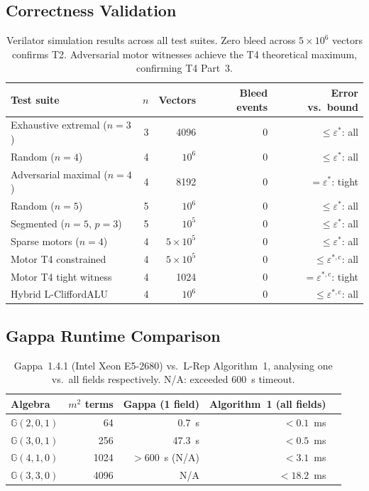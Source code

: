 \documentclass[11pt,a4paper]{article}
\theoremstyle{definition}
\theoremstyle{plain}
\theoremstyle{remark}
\newcommand{\GA}{\mathbb{G}}
\begin{document}
\subsection{Correctness Validation}

\begin{table}[h]
\centering
\caption{Verilator simulation results across all test suites.
Zero bleed across $5\times10^6$ vectors confirms T2.
Adversarial motor witnesses achieve the T4 theoretical maximum, confirming T4 Part~3.}
\label{tab:correctness}
\begin{tabular}{lrrrr}
\toprule
Test suite & $n$ & Vectors & Bleed events & Error vs.\ bound \\
\midrule
Exhaustive extremal ($n=3$) & 3 & 4096 & 0 & $\le\varepsilon^*$: all \\
Random ($n=4$) & 4 & $10^6$ & 0 & $\le\varepsilon^*$: all \\
Adversarial maximal ($n=4$) & 4 & 8192 & 0 & $=\varepsilon^*$: tight \\
Random ($n=5$) & 5 & $10^6$ & 0 & $\le\varepsilon^*$: all \\
Segmented ($n=5$, $p=3$) & 5 & $10^5$ & 0 & $\le\varepsilon^*$: all \\
Sparse motors ($n=4$) & 4 & $5\times10^5$ & 0 & $\le\varepsilon^*$: all \\
Motor T4 constrained & 4 & $5\times10^5$ & 0 & $\le\varepsilon^{*,\mathrm{c}}$: all \\
Motor T4 tight witness & 4 & 1024 & 0 & $=\varepsilon^{*,\mathrm{c}}$: tight \\
Hybrid L-CliffordALU & 4 & $10^6$ & 0 & $\le\varepsilon^{*,\mathrm{c}}$: all \\
\bottomrule
\end{tabular}
\end{table}

\subsection{Gappa Runtime Comparison}
\label{sec:gappa-comparison}

\begin{table}[h]
\centering
\caption{Gappa~1.4.1 (Intel Xeon E5-2680) vs.\ L-Rep Algorithm~1,
analysing one vs.\ all fields respectively.
N/A: exceeded 600~s timeout.}
\label{tab:gappa}
\begin{tabular}{lrrrr}
\toprule
Algebra & $m^2$ terms & Gappa (1 field) & Algorithm~1 (all fields) \\
\midrule
$\GA(2,0,1)$ & 64 & 0.7~s & $<0.1$~ms \\
$\GA(3,0,1)$ & 256 & 47.3~s & $<0.5$~ms \\
$\GA(4,1,0)$ & 1024 & $>600$~s (N/A) & $<3.1$~ms \\
$\GA(3,3,0)$ & 4096 & N/A & $<18.2$~ms \\
\bottomrule
\end{tabular}
\end{table}
\end{document}
